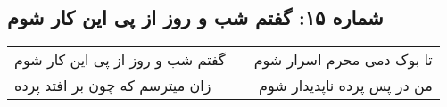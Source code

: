 \begin{center}
\section*{شماره ۱۵: گفتم شب و روز از پی این کار شوم}
\label{sec:015}
\begin{longtable}{l p{0.5cm} r}
گفتم شب و روز از پی این کار شوم
&&
تا بوک دمی محرم اسرار شوم
\\
زان میترسم که چون بر افتد پرده
&&
من در پس پرده ناپدیدار شوم
\\
\end{longtable}
\end{center}
